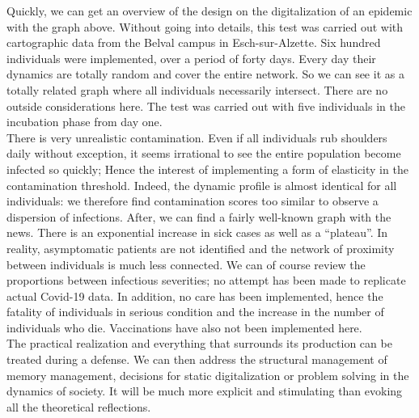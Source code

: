 Quickly, we can get an overview of the design on the digitalization of an epidemic with the graph above. Without going into details, this test was carried out with cartographic data from the Belval campus in Esch-sur-Alzette. Six hundred individuals were implemented, over a period of forty days. Every day their dynamics are totally random and cover the entire network. So we can see it as a totally related graph where all individuals necessarily intersect. There are no outside considerations here. The test was carried out with five individuals in the incubation phase from day one.\\

There is very unrealistic contamination. Even if all individuals rub shoulders daily without exception, it seems irrational to see the entire population become infected so quickly; Hence the interest of implementing a form of elasticity in the contamination threshold. Indeed, the dynamic profile is almost identical for all individuals: we therefore find contamination scores too similar to observe a dispersion of infections. After, we can find a fairly well-known graph with the news. There is an exponential increase in sick cases as well as a ``plateau''. In reality, asymptomatic patients are not identified and the network of proximity between individuals is much less connected. We can of course review the proportions between infectious severities; no attempt has been made to replicate actual Covid-19 data. In addition, no care has been implemented, hence the fatality of individuals in serious condition and the increase in the number of individuals who die. Vaccinations have also not been implemented here.\\

The practical realization and everything that surrounds its production can be treated during a defense. We can then address the structural management of memory management, decisions for static digitalization or problem solving in the dynamics of society. It will be much more explicit and stimulating than evoking all the theoretical reflections.